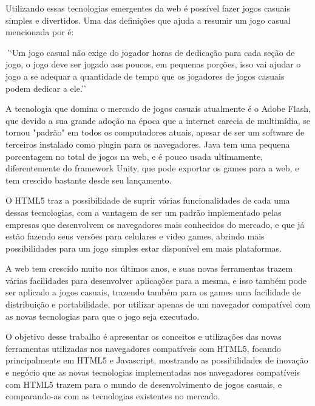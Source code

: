 Utilizando essas tecnologias emergentes da web é possível fazer jogos casuais simples
e divertidos. Uma das definições que ajuda a resumir um jogo casual
mencionada por  é:

\begin{singlespacing}
\begin{citacao}{4cm}{0cm}\footnotesize \emph
    ``Um jogo casual não exige do jogador horas de
      dedicação para cada seção de jogo, o jogo deve ser jogado aos poucos, em pequenas
      porções, isso vai ajudar o jogo a se adequar a quantidade de tempo que os jogadores
      de jogos casuais podem dedicar a ele.''
\end{citacao}
\end{singlespacing}

A tecnologia que domina o mercado de jogos casuais atualmente é o Adobe Flash, que devido
a sua grande adoção na época que a internet carecia de multimídia, se tornou "padrão"
em todos os computadores atuais, apesar de ser um software de terceiros instalado
como plugin para os navegadores. Java tem uma pequena porcentagem no total de jogos
na web, e é pouco usada ultimamente, diferentemente do framework Unity, que pode exportar
os games para a web, e tem crescido bastante desde seu lançamento.

O HTML5 traz a possibilidade de suprir várias funcionalidades de cada uma dessas tecnologias,
com a vantagem de ser um padrão implementado pelas empresas que desenvolvem os navegadores
mais conhecidos do mercado, e que já estão fazendo seus versões para celulares e
video games, abrindo mais possibilidades para um jogo simples estar disponível em mais plataformas.

A web tem crescido muito nos últimos anos, e suas novas ferramentas trazem várias
facilidades para desenvolver aplicações para a mesma, e isso também pode ser aplicado
a jogos casuais, trazendo também para os games uma facilidade de distribuição e portabilidade,
por utilizar apenas de um navegador compatível com as novas tecnologias
para que o jogo seja executado.

O objetivo desse trabalho é apresentar os conceitos e utilizações das novas ferramentas utilizadas
nos navegadores compatíveis com HTML5, focando principalmente em HTML5
e Javascript, mostrando as possibilidades de inovação e negócio que as novas tecnologias implementadas
nos navegadores compatíveis com HTML5 trazem para o mundo de
desenvolvimento de jogos casuais, e comparando-as com as tecnologias existentes no mercado.

